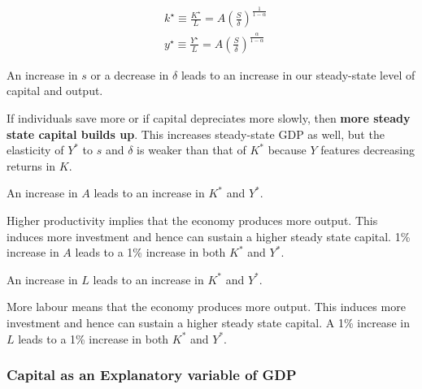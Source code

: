 \documentclass[11pt]{article}
\begin{document}
\begin{equation}
\begin{aligned}
& k^{\star} \equiv \frac{K^{\star}}{L}=A\left(\frac{S}{\delta}\right)^{\frac{1}{1-\alpha}} \\
& y^{\star} \equiv \frac{Y^{\star}}{L}=A\left(\frac{S}{\delta}\right)^{\frac{\alpha}{1-\alpha}}
\end{aligned}
\end{equation}

\begin{mdframed}
An increase in $s$ or a decrease in $\delta$ leads to an increase in our steady-state level of capital and output.
\begin{intu}
    If individuals save more or if capital depreciates more slowly, then \textbf{more steady state capital builds up}. This increases steady-state GDP as well, but the elasticity of $Y^*$ to $s$ and $\delta$ is weaker than that of $K^*$ because $Y$ features decreasing returns in $K$.
\end{intu}
\end{mdframed}

\begin{mdframed}
    An increase in $A$ leads to an increase in $K^*$ and $Y^*$.
    \begin{intu}
        Higher productivity implies that the economy produces more output. This induces more investment and hence can sustain a higher steady state capital. 1\% increase in $A$ leads to a 1\% increase in both $K^*$ and $Y^*$.
    \end{intu}
\end{mdframed}

\begin{mdframed}
    An increase in $L$ leads to an increase in $K^*$ and $Y^*$.
    \begin{intu}
        More labour means that the economy produces more output. This induces more investment and hence can sustain a higher steady state capital. A 1\% increase in $L$ leads to a 1\% increase in both $K^*$ and $Y^*$.
    \end{intu}
\end{mdframed}

\subsubsection{Capital as an Explanatory variable of GDP}
\end{document}
